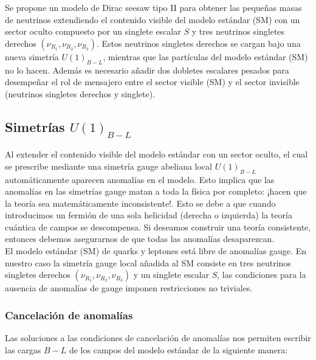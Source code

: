 \documentclass[12pt]{article}
\begin{document}
Se propone un modelo de Dirac seesaw tipo II para obtener las pequeñas masas de neutrinos extendiendo el contenido visible del modelo estándar (SM) con un sector oculto compuesto por un singlete escalar $S$ y tres  neutrinos singletes derechos $(\nu_{R_1},\nu_{R_2}, \nu_{R_3} )$. Estos neutrinos singletes derechos se cargan bajo una nueva simetría $U(1)_{B-L}$, mientras que las partículas del modelo estándar (SM) no lo hacen. Además es necesario añadir dos dobletes escalares pesados para desempeñar el rol de mensajero entre el sector visible (SM) y el sector invisible (neutrinos singletes derechos y singlete). 





\subsection{Simetrías $U(1)_{B-L}$ } 

Al extender el contenido visible del modelo estándar con un sector oculto, el cual se prescribe mediante una simetría gauge abeliana local $U(1)_{B-L}$ automáticamente aparecen anomalías en el modelo. Esto implica que las anomalías en las simetrías gauge matan a toda la física por completo: ¡hacen que la teoría sea matemáticamente inconsistente!. Esto se debe a que cuando introducimos un fermión de una sola helicidad (derecha o izquierda) la teoría cuántica de campos se descompensa. Si deseamos construir una teoría consistente, entonces debemos asegurarnos de que todas las anomalías desaparezcan. \\ 


El modelo estándar (SM) de quarks y leptones está libre de anomalías gauge. En nuestro  caso la simetría gauge local añadida al SM consiste en tres  neutrinos singletes derechos $(\nu_{R_1},\nu_{R_2}, \nu_{R_3} )$ y un singlete escalar $S$, las condiciones para la ausencia de anomalías de gauge imponen restricciones no triviales. \\ 




\subsubsection{Cancelación de anomalías}

Las soluciones a las condiciones de cancelación de anomalías nos permiten escribir las cargas $B-L$ de los campos del modelo estándar de la siguiente manera:  
\end{document}
